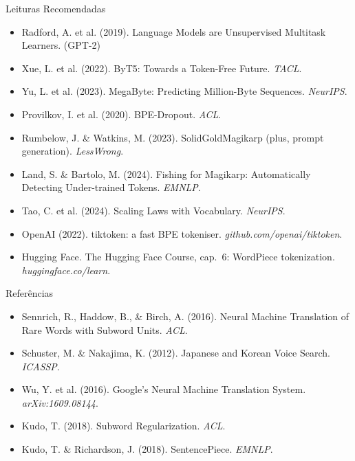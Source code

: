 \documentclass[aspectratio=169,xcolor=dvipsnames]{beamer}
\begin{document}
\begin{frame}{Leituras Recomendadas}
    \leiturasize
    \begin{itemize}
        \item Radford, A. et al. (2019). Language Models are Unsupervised Multitask Learners. (GPT-2)
        \item Xue, L. et al. (2022). ByT5: Towards a Token-Free Future. \textit{TACL}.
        \item Yu, L. et al. (2023). MegaByte: Predicting Million-Byte Sequences. \textit{NeurIPS}.
        \item Provilkov, I. et al. (2020). BPE-Dropout. \textit{ACL}.
        \item Rumbelow, J. \& Watkins, M. (2023). SolidGoldMagikarp (plus, prompt generation). \textit{LessWrong}.
        \item Land, S. \& Bartolo, M. (2024). Fishing for Magikarp: Automatically Detecting Under-trained Tokens. \textit{EMNLP}.
        \item Tao, C. et al. (2024). Scaling Laws with Vocabulary. \textit{NeurIPS}.
        \item OpenAI (2022). tiktoken: a fast BPE tokeniser. \textit{github.com/openai/tiktoken}.
        \item Hugging Face. The Hugging Face Course, cap.\ 6: WordPiece tokenization. \textit{huggingface.co/learn}.
    \end{itemize}
\end{frame}

\begin{frame}{Referências}

\small

\begin{itemize}
    \item Sennrich, R., Haddow, B., \& Birch, A. (2016). Neural Machine Translation of Rare Words with Subword Units. \textit{ACL}.
    \item Schuster, M. \& Nakajima, K. (2012). Japanese and Korean Voice Search. \textit{ICASSP}.
    \item Wu, Y. et al. (2016). Google's Neural Machine Translation System. \textit{arXiv:1609.08144}.
    \item Kudo, T. (2018). Subword Regularization. \textit{ACL}.
    \item Kudo, T. \& Richardson, J. (2018). SentencePiece. \textit{EMNLP}.
\end{itemize}

\end{frame}
\end{document}
